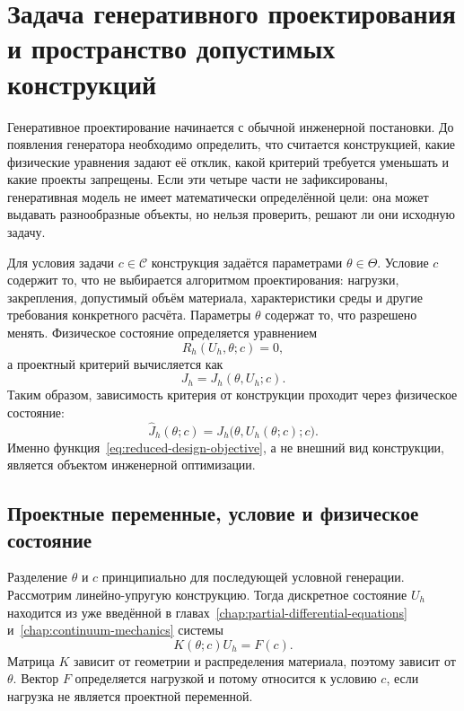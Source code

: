 \section{Задача генеративного проектирования и пространство допустимых конструкций}

Генеративное проектирование начинается с обычной инженерной постановки. До появления генератора необходимо определить, что считается конструкцией, какие физические уравнения задают её отклик, какой критерий требуется уменьшать и какие проекты запрещены. Если эти четыре части не зафиксированы, генеративная модель не имеет математически определённой цели: она может выдавать разнообразные объекты, но нельзя проверить, решают ли они исходную задачу.

Для условия задачи $c\in\mathcal C$ конструкция задаётся параметрами $\theta\in\Theta$. Условие $c$ содержит то, что не выбирается алгоритмом проектирования: нагрузки, закрепления, допустимый объём материала, характеристики среды и другие требования конкретного расчёта. Параметры $\theta$ содержат то, что разрешено менять. Физическое состояние определяется уравнением
\begin{equation}
\label{eq:design-state-equation}
 R_h(U_h,\theta;c)=0,
\end{equation}
а проектный критерий вычисляется как
\begin{equation}
 J_h=J_h(\theta,U_h;c).
\end{equation}
Таким образом, зависимость критерия от конструкции проходит через физическое состояние:
\begin{equation}
\label{eq:reduced-design-objective}
 \widehat J_h(\theta;c)
 =
 J_h\bigl(\theta,U_h(\theta;c);c\bigr).
\end{equation}
Именно функция~\eqref{eq:reduced-design-objective}, а не внешний вид конструкции, является объектом инженерной оптимизации.

\subsection{Проектные переменные, условие и физическое состояние}

Разделение $\theta$ и $c$ принципиально для последующей условной генерации. Рассмотрим линейно-упругую конструкцию. Тогда дискретное состояние $U_h$ находится из уже введённой в главах~\ref{chap:partial-differential-equations} и~\ref{chap:continuum-mechanics} системы
\begin{equation}
\label{eq:elastic-state-design}
 K(\theta;c)U_h=F(c).
\end{equation}
Матрица $K$ зависит от геометрии и распределения материала, поэтому зависит от $\theta$. Вектор $F$ определяется нагрузкой и потому относится к условию $c$, если нагрузка не является проектной переменной.

